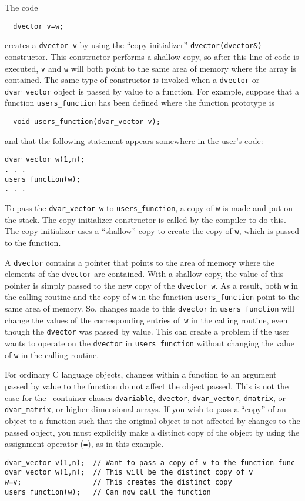 \documentclass{admbmanual}
\begin{document}
The code
\begin{lstlisting}
  dvector v=w;
\end{lstlisting}
creates a \texttt{dvector v} by using the ``copy initializer''
\texttt{dvector(dvector\&)} constructor. This constructor performs a shallow
copy, so after this line of code is executed, \texttt{v} and \texttt{w} will
both point to the same area of memory where the array is contained. The same
type of constructor is invoked when a \texttt{dvector} or \texttt{dvar\_vector}
object is passed by value to a function. For example, suppose that a function
\texttt{users\_function} has been defined where the function prototype is
\begin{lstlisting}
  void users_function(dvar_vector v);
\end{lstlisting}
and that the following statement appears somewhere in the user's code:
\begin{lstlisting}
dvar_vector w(1,n);
. . .
users_function(w);
. . .
\end{lstlisting}

To pass the \texttt{dvar\_vector w} to \texttt{users\_function}, a copy of
\texttt{w} is made and put on the stack. The copy initializer constructor is
called by the compiler to do this. The copy initializer uses a ``shallow'' copy
to create the copy of \texttt{w}, which is passed to the function.

A \texttt{dvector} contains a pointer that points to the area of memory where
the elements of the \texttt{dvector} are contained. With a shallow copy, the
value of this pointer is simply passed to the new copy of the \texttt{dvector
  w}. As a result, both \texttt{w} in the calling routine and the copy of
\texttt{w} in the function \texttt{users\_function} point to the same area of
memory. So, changes made to this \texttt{dvector} in \texttt{users\_function}
will change the values of the corresponding entries of~\texttt{w} in the calling
routine, even though the \texttt{dvector} was passed by value. This can create a
problem if the user wants to operate on the \texttt{dvector} in
\texttt{users\_function} without changing the value of \texttt{w} in the calling
routine.

For ordinary C language objects, changes within a function to an argument passed
by value to the function do not affect the object passed. This is not the case
for the \scAD\ container classes \texttt{dvariable}, \texttt{dvector},
\texttt{dvar\_vector}, \texttt{dmatrix}, or \texttt{dvar\_matrix}, or
higher-dimensional arrays. If you wish to pass a ``copy'' of an object to a
function such that the original object is not affected by changes to the passed
object, you must explicitly make a distinct copy of the object by using the
assignment operator (\texttt{=}), as in this example.
\begin{lstlisting}
dvar_vector v(1,n);  // Want to pass a copy of v to the function func
dvar_vector w(1,n);  // This will be the distinct copy of v
w=v;                 // This creates the distinct copy
users_function(w);   // Can now call the function
\end{lstlisting}
\end{document}
